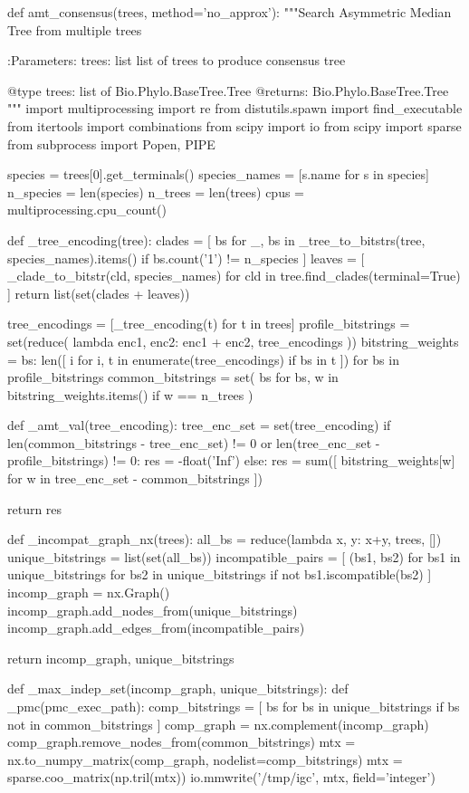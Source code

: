 \documentclass[a4paper, 12pt]{book}
\begin{document}
\begin{python}
def amt_consensus(trees, method='no_approx'):
  """Search Asymmetric Median Tree from multiple trees

  :Parameters:
  trees: list
      list of trees to produce consensus tree

  @type trees: list of Bio.Phylo.BaseTree.Tree
  @returns: Bio.Phylo.BaseTree.Tree
  """
  import multiprocessing
  import re
  from distutils.spawn import find_executable
  from itertools import combinations
  from scipy import io
  from scipy import sparse
  from subprocess import Popen, PIPE

  species = trees[0].get_terminals()
  species_names = [s.name for s in species]
  n_species = len(species)
  n_trees = len(trees)
  cpus = multiprocessing.cpu_count()

  def _tree_encoding(tree):
    clades = [
      bs for _, bs 
      in _tree_to_bitstrs(tree, species_names).items() 
      if bs.count('1') != n_species
    ]
    leaves = [
      _clade_to_bitstr(cld, species_names) for cld 
      in tree.find_clades(terminal=True)
    ]
    return list(set(clades + leaves))

  tree_encodings = [_tree_encoding(t) for t in trees]
  profile_bitstrings = set(reduce(
    lambda enc1, enc2: enc1 + enc2, tree_encodings
  ))
  bitstring_weights = {
    bs: len([
      i for i, t 
      in enumerate(tree_encodings) if bs in t
    ]) for bs in profile_bitstrings
  }
  common_bitstrings = set(
    bs for bs, w in bitstring_weights.items() 
    if w == n_trees
  )

  def _amt_val(tree_encoding):
    tree_enc_set = set(tree_encoding)
    if len(common_bitstrings - tree_enc_set) != 0 or len(tree_enc_set - profile_bitstrings) != 0:
      res = -float('Inf')
    else:
      res = sum([
        bitstring_weights[w] 
        for w in tree_enc_set - common_bitstrings
      ])

    return res

  def _incompat_graph_nx(trees):
    all_bs = reduce(lambda x, y: x+y, trees, [])
    unique_bitstrings = list(set(all_bs))
    incompatible_pairs = [
      (bs1, bs2) for bs1 in unique_bitstrings 
      for bs2 in unique_bitstrings 
      if not bs1.iscompatible(bs2)
    ]
    incomp_graph = nx.Graph()
    incomp_graph.add_nodes_from(unique_bitstrings)
    incomp_graph.add_edges_from(incompatible_pairs)

    return incomp_graph, unique_bitstrings

  def _max_indep_set(incomp_graph, unique_bitstrings):
    def _pmc(pmc_exec_path):
      comp_bitstrings = [
        bs for bs in unique_bitstrings 
        if bs not in common_bitstrings
      ]
      comp_graph = nx.complement(incomp_graph)
      comp_graph.remove_nodes_from(common_bitstrings)
      mtx = nx.to_numpy_matrix(comp_graph, nodelist=comp_bitstrings)
      mtx = sparse.coo_matrix(np.tril(mtx))
      io.mmwrite('/tmp/igc', mtx, field='integer')


\end{python}
\end{document}
